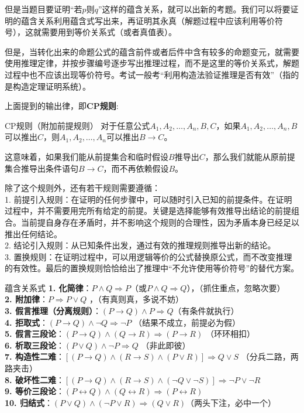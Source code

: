\documentclass[lang=cn,11pt]{elegantbook}
\begin{document}
但是当题目要证明“若$p$则$q$”这样的蕴含关系，就可以出新的考题。我们可以将要证明的蕴含关系利用蕴含式写出来，再证明其永真（解题过程中应该利用等价符号），这就需要用到等价关系式（或者真值表）。

但是，当转化出来的命题公式的蕴含前件或者后件中含有较多的命题变元，就需要使用推理定律，并按步骤编号逐步写出推理过程，而不是这里的等价关系式，解题过程中也不应该出现等价符号。考试一般考“利用构造法验证推理是否有效”（指的是构造定理证明系统）。

上面提到的输出律，即\textbf{CP规则}:
\begin{theorem}{CP规则（附加前提规则）}
对于任意公式$A_1, A_2, \ldots, A_n, B, C$，如果$A_1, A_2, \ldots, A_n, B$可以推出$C$，则$A_1, A_2, \ldots, A_n$可以推出$B \rightarrow C$。

这意味着，如果我们能从前提集合和临时假设$B$推导出$C$，那么我们就能从原前提集合推导出条件语句$B \rightarrow C$，而不再依赖假设$B$。
\end{theorem}
除了这个规则外，还有若干规则需要遵循：\\
1. 前提引入规则：在证明的任何步骤中，可以随时引入已知的前提条件。在证明过程中，并不需要用完所有给定的前提。关键是选择能够有效推导出结论的前提组合。当前提自身存在矛盾时，并不影响这个规则的合理性，因为矛盾本身已经足以推出任何结论。\\
2. 结论引入规则：从已知条件出发，通过有效的推理规则推导出新的结论。\\
3. 置换规则：在证明过程中，可以用逻辑等价的公式替换原公式，而不改变推理的有效性。最后的置换规则恰恰给出了推理中“不允许使用等价符号”的替代方案。
\begin{theorem}{蕴含关系式}
\textbf{1. 化简律}：$P \land Q \Rightarrow P$（或$P \land Q \Rightarrow Q$），（抓住重点，忽略次要）\\
\textbf{2. 附加律}：$P \Rightarrow P \lor Q$ ，（有真则真，多说不妨）\\
\textbf{3. 假言推理（分离规则）}：$(P \rightarrow Q) \land P \Rightarrow Q$（有条件就执行） \\
\textbf{4. 拒取式}：$(P \rightarrow Q) \land \neg Q \Rightarrow \neg P$ （结果不成立，前提必为假）\\
\textbf{5. 假言三段论}：$(P \rightarrow Q) \land (Q \rightarrow R) \Rightarrow (P \rightarrow R)$ （环环相扣）\\
\textbf{6. 析取三段论}：$(P \lor Q) \land \neg P \Rightarrow Q$ （非此即彼）\\
\textbf{7. 构造性二难}：$[(P \rightarrow Q) \land (R \rightarrow S)\land(P \lor R)] \Rightarrow Q \lor S$ （分兵二路，两路夹击）\\
\textbf{8. 破坏性二难}：$[(P \rightarrow Q) \land (R \rightarrow S)\land(\neg Q \lor \neg S)] \Rightarrow \neg P \lor \neg R$ \\
\textbf{9. 等价三段论}：$(P \leftrightarrow Q) \land (Q \leftrightarrow R) \Rightarrow (P \leftrightarrow R)$ \\
\textbf{10. 归结式}：$(P \lor Q) \land (\neg P \lor R) \Rightarrow (Q \lor R)$（两头下注，必中一个）
\end{theorem}
\end{document}
